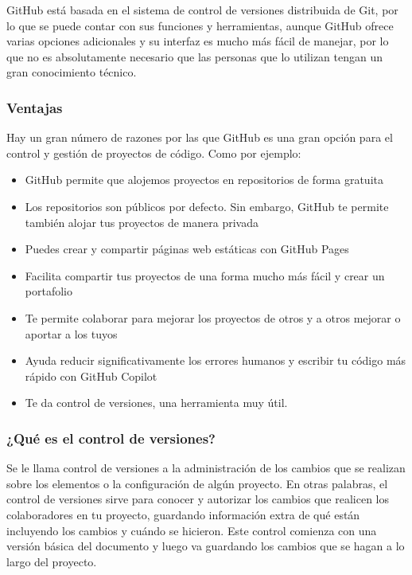 \documentclass[
]{article}
\providecommand{\tightlist}{%
  \setlength{\itemsep}{0pt}\setlength{\parskip}{0pt}}
\begin{document}
GitHub está basada en el sistema de control de versiones distribuida de
Git, por lo que se puede contar con sus funciones y herramientas, aunque
GitHub ofrece varias opciones adicionales y su interfaz es mucho más
fácil de manejar, por lo que no es absolutamente necesario que las
personas que lo utilizan tengan un gran conocimiento técnico.

\hypertarget{ventajas}{%
\subsubsection{Ventajas}\label{ventajas}}

Hay un gran número de razones por las que GitHub es una gran opción para
el control y gestión de proyectos de código. Como por ejemplo:

\begin{itemize}
\tightlist
\item
  GitHub permite que alojemos proyectos en repositorios de forma
  gratuita
\item
  Los repositorios son públicos por defecto. Sin embargo, GitHub te
  permite también alojar tus proyectos de manera privada
\item
  Puedes crear y compartir páginas web estáticas con GitHub Pages
\item
  Facilita compartir tus proyectos de una forma mucho más fácil y crear
  un portafolio
\item
  Te permite colaborar para mejorar los proyectos de otros y a otros
  mejorar o aportar a los tuyos
\item
  Ayuda reducir significativamente los errores humanos y escribir tu
  código más rápido con GitHub Copilot
\item
  Te da control de versiones, una herramienta muy útil.
\end{itemize}

\hypertarget{quuxe9-es-el-control-de-versiones}{%
\subsubsection{¿Qué es el control de
versiones?}\label{quuxe9-es-el-control-de-versiones}}

Se le llama control de versiones a la administración de los cambios que
se realizan sobre los elementos o la configuración de algún proyecto. En
otras palabras, el control de versiones sirve para conocer y autorizar
los cambios que realicen los colaboradores en tu proyecto, guardando
información extra de qué están incluyendo los cambios y cuándo se
hicieron. Este control comienza con una versión básica del documento y
luego va guardando los cambios que se hagan a lo largo del proyecto.
\end{document}
